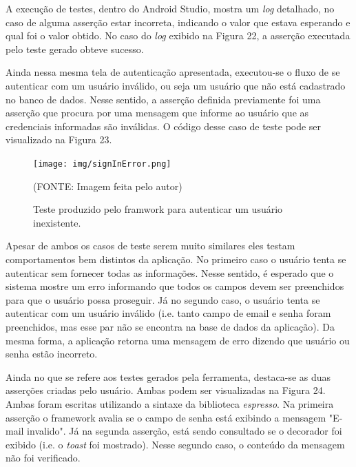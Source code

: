 \documentclass[
    12pt,       %
    openright,      %
    twoside,      %
    a4paper,      %
    english,      %
    french,       %
    spanish,      %
    brazil,       %
    ]{abntex2}
\begin{document}
      A execução de testes, dentro do Android Studio, mostra um \textit{log} detalhado, no caso de alguma
      asserção estar incorreta, indicando o valor que estava esperando e qual foi o valor obtido. No caso do
      \textit{log} exibido na Figura 22, a asserção executada pelo teste gerado obteve sucesso.

      Ainda nessa mesma tela de autenticação apresentada, executou-se o fluxo de se autenticar com
      um usuário inválido, ou seja um usuário que não está cadastrado no banco de dados. Nesse sentido,
      a asserção definida previamente foi uma asserção que procura por uma mensagem que informe ao
      usuário que as credenciais informadas são inválidas. O código desse caso de teste pode ser visualizado
      na Figura 23.

      \begin{figure}[htbp]
        \begin{center}
          \texttt{[image: img/signInError.png]}
            \end{center}
          \caption{\label{fig:passaro} Teste produzido pelo framwork para autenticar um usuário inexistente.}
        \begin{center}(FONTE: Imagem feita pelo autor)\end{center}
      \end{figure}

      Apesar de ambos os casos de teste serem muito similares eles testam comportamentos bem distintos da
      aplicação. No primeiro caso o usuário tenta se autenticar sem fornecer todas as informações. Nesse
      sentido, é esperado que o sistema mostre um erro informando que todos os campos devem ser preenchidos
      para que o usuário possa proseguir. Já no segundo caso, o usuário tenta se autenticar com um usuário
      inválido (i.e. tanto campo de email e senha foram preenchidos, mas esse par não se encontra na base
      de dados da aplicação). Da mesma forma, a aplicação retorna uma mensagem de erro dizendo que usuário
      ou senha estão incorreto.

      Ainda no que se refere aos testes gerados pela ferramenta, destaca-se as duas asserções criadas
      pelo usuário. Ambas podem ser visualizadas na Figura 24. Ambas foram escritas utilizando a sintaxe
      da biblioteca \textit{espresso}. Na primeira asserção o framework avalia se o campo de senha está
      exibindo a mensagem "E-mail invalido". Já na segunda asserção, está sendo consultado se o decorador
      foi exibido (i.e. o \textit{toast} foi mostrado). Nesse segundo caso, o conteúdo da mensagem não foi
      verificado.
\end{document}
